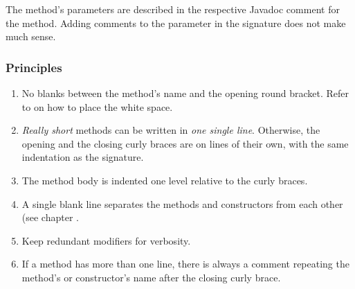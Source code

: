 The method's parameters are described in the respective Javadoc comment for the method. Adding comments to the parameter in the signature does not make much sense.

\subsubsection{Principles}
\begin{enumerate}[label=P\arabic*.]
	\item{No blanks between the method's name and the opening round bracket. Refer to  on how to place the white space.}

	\item{\textit{Really short} methods can be written in \textit{one single line}. Otherwise, the opening and the closing curly braces are on lines of their own, with the same indentation as the signature.}

	\item{The method body is indented one level relative to the curly braces.}

	\item{A single blank line separates the methods and constructors from each other (see chapter .}

	\item{Keep redundant modifiers for verbosity.}

	\item{If a method has more than one line, there is always a comment repeating the method's or constructor's name after the closing curly brace.} 
\end{enumerate}

